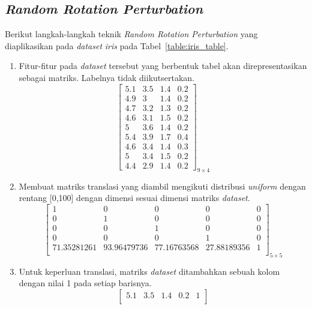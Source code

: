 \subsection{\textit{Random Rotation Perturbation}}
\label{subsec:studi-rrp}

Berikut langkah-langkah teknik \textit{Random Rotation Perturbation} yang diaplikasikan pada \textit{dataset} \textit{iris} pada Tabel~\ref{table:iris_table}.
\begin{enumerate}
    \item Fitur-fitur pada \textit{dataset} tersebut yang berbentuk tabel akan direpresentasikan sebagai matriks. Labelnya tidak diikutsertakan.
    \[
        \begin{bmatrix}
        5.1		&		3.5		&		1.4		&		0.2	\\
        4.9		&		3		&		1.4		&		0.2	\\
        4.7		&		3.2		&		1.3		&		0.2	\\
        4.6		&		3.1		&		1.5		&		0.2	\\
        5		&		3.6		&		1.4		&		0.2	\\
        5.4		&		3.9		&		1.7		&		0.4	\\
        4.6		&		3.4		&		1.4		&		0.3	\\
        5		&		3.4		&		1.5		&		0.2	\\
        4.4		&		2.9		&		1.4		&		0.2 
        \end{bmatrix}_{9\times 4}
    \]
    \item Membuat matriks translasi yang diambil mengikuti distribusi \textit{uniform} dengan rentang [0,100] dengan dimensi sesuai dimensi matriks \textit{dataset}.
    \[
        \begin{bmatrix}
            1				&		0				&		0				&		0			&		0 \\
            0				&		1				&		0				&		0			&		0 \\
            0				&		0				&		1				&		0			&		0 \\
            0				&		0				&		0				&		1 			&		0 \\
            71.35281261		&		93.96479736		&		77.16763568		&		27.88189356 &		1 \\
        \end{bmatrix}_{5\times 5}
    \]
    \item Untuk keperluan translasi, matriks \textit{dataset} ditambahkan sebuah kolom dengan nilai 1 pada setiap barisnya.
    \[
        \begin{bmatrix}
            5.1		&		3.5		&		1.4		&		0.2		&		1 \\

\end{bmatrix}\]
\end{enumerate}
